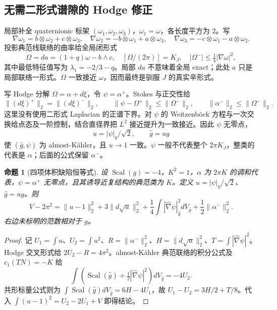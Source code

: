 \documentclass[UTF8,fontset=fandol,zihao=-4,oneside,openany]{ctexbook}
\theoremstyle{cjkplain}
\newtheorem{proposition}[theorem]{命题}
\numberwithin{equation}{chapter}
\begin{document}
\subsection{无需二形式谱隙的 Hodge 修正}
局部补全 quaternionic 标架 $(\omega_1,\omega_2,\omega_3)$，$\omega_1=\omega$，各长度平方为 $2$。写
\[
\nabla\omega_1=b\otimes\omega_2+c\otimes\omega_3,
\quad\nabla\omega_2=-b\otimes\omega_1+a\otimes\omega_3,
\quad\nabla\omega_3=-c\otimes\omega_1-a\otimes\omega_2.
\]
投影典范线联络的曲率给全局闭形式
\begin{equation}\label{GAU:closed-canonical}
\Omega=da=(1+q)\omega-b\wedge c,
\quad [\Omega/(2\pi)]=K_J,
\quad |\Omega^-|\le\tfrac14|\nabla\omega|^2,
\end{equation}
其中最低特征值写为 $\lambda_1=-2/3-q$。局部 $da$ 不意味着全局 exact；此处 $a$ 只是局部联络一形式。$\Omega$ 一致接近 $\omega$，因而最终是驯服 $J$ 的真实辛形式。

写 Hodge 分解 $\Omega=\alpha+d\xi$，令 $\psi=\alpha^+$。Stokes 与正交性给
\begin{equation}\label{GAU:Hodge-no-gap}
\|(d\xi)^+\|_2=\|(d\xi)^-\|_2,
\qquad \|\psi-\Omega^+\|_2\le\|\Omega^-\|_2,
\qquad \|\alpha^-\|_2\le\|\Omega^-\|_2.
\end{equation}
这里没有使用二形式 Laplacian 的正谱下界。对 $\psi$ 的 Weitzenböck 方程与一次交换给点态及一阶控制，结合直径界把 $L^2$ 接近提升为一致接近。因此 $\psi$ 无零点，
\[
u=|\psi|_g/\sqrt2,\qquad \widehat g=u g
\]
使 $(\widehat g,\psi)$ 为 almost-Kähler，且 $u\to1$ 一致。$\psi$ 一般不代表整个 $2\pi K_J$，整类的代表是 $\alpha$；后面的公式保留 $\alpha^-$。

\begin{proposition}[四项体积缺陷恒等式]\label{GAU:four-term}
设 $\operatorname{Scal}(g)=-4$，$K^2=1$，$\alpha$ 为 $2\pi K$ 的调和代表，$\psi=\alpha^+$ 无零点，且其诱导近复结构的典范类为 $K$。定义 $u=|\psi|_g/\sqrt2$、$\widehat g=ug$。则
\begin{equation}\label{GAU:four-term-eq}
\boxed{V-2\pi^2=\|u-1\|_2^2+3\|d\sqrt u\|_2^2
+\frac14\int|\widehat\nabla\psi|_{\widehat g}^2dV_{\widehat g}
+\frac12\|\alpha^-\|_2^2.}
\end{equation}
右边未标明的范数相对于 $g$。
\end{proposition}
\begin{proof}
记 $U_1=\int u$、$U_2=\int u^2$、$R=\|\alpha^-\|_2^2$、$H=\|d\sqrt u\|_2^2$、$T=\int|\widehat\nabla\psi|^2$。Hodge 交叉形式给 $2U_2-R=4\pi^2$。almost-Kähler 典范联络的积分公式及 $c_1(TN)=-K$ 给
\[
\int(\operatorname{Scal}(\widehat g)+\tfrac12|\widehat\nabla\psi|^2)dV_{\widehat g}=-4U_2.
\]
共形标量公式则为 $\int\operatorname{Scal}(\widehat g)dV_{\widehat g}=6H-4U_1$，故 $U_1-U_2=3H/2+T/8$。代入 $\int(u-1)^2=U_2-2U_1+V$ 即得结论。
\end{proof}
\end{document}
